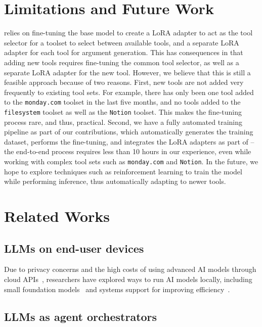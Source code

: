 \section{Limitations and Future Work}
\label{sec:limitations}
\sys{} relies on fine-tuning the base model to create a LoRA adapter to act as the tool selector for a toolset to select between available tools, and a separate LoRA adapter for each tool for argument generation. This has consequences in that adding new tools requires fine-tuning the common tool selector, as well as a separate LoRA adapter for the new tool. However, we believe that this is still a feasible approach because of two reasons. First, new tools are not added very frequently to existing tool sets. For example, there has only been one tool added to the \texttt{monday.com} toolset in the last five months, and no tools added to the \texttt{filesystem} toolset as well as the \texttt{Notion} toolset. This makes the fine-tuning process rare, and thus, practical. Second, we have a fully automated training pipeline as part of our contributions, which automatically generates the training dataset, performs the fine-tuning, and integrates the LoRA adapters as part of \sys{} -- the end-to-end process requires less than 10 hours in our experience, even while working with complex tool sets such as \texttt{monday.com} and \texttt{Notion}. In the future, we hope to explore techniques such as reinforcement learning to train the model while performing inference, thus automatically adapting to newer tools. 

\section{Related Works}

\subsection{LLMs on end-user devices}

Due to privacy concerns and the high costs of using advanced AI models through cloud APIs~\cite{hasan2025model, hou2025model, guo2025systematic}, researchers have explored ways to run AI models locally, including small foundation models~\cite{belcak2025small,apple_macbookpro_2024} and systems support for improving efficiency~\cite{frantar2022gptq, llama_cpp}. %

\subsection{LLMs as agent orchestrators}

